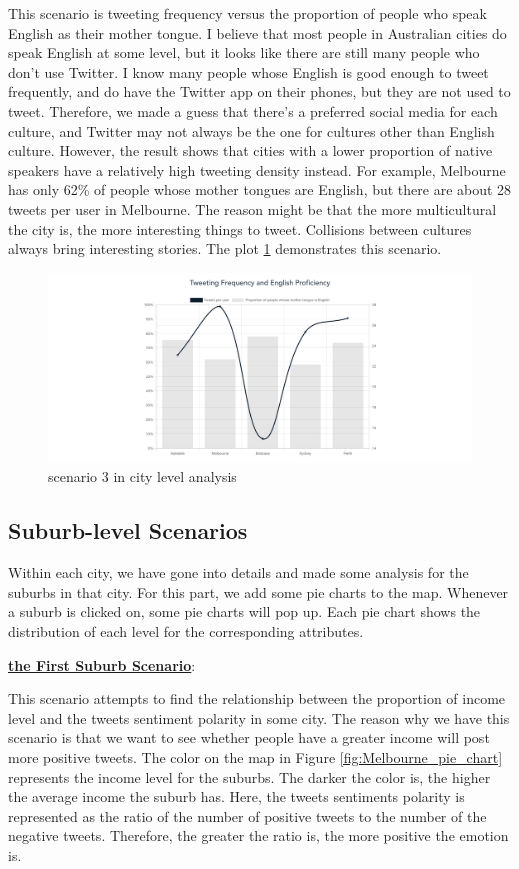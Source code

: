 \documentclass{article}
\begin{document}
This scenario is tweeting frequency versus the proportion of people who speak English as their mother tongue. I believe that most people in Australian cities do speak English at some level, but it looks like there are still many people who don’t use Twitter. I know many people whose English is good enough to tweet frequently, and do have the Twitter app on their phones, but they are not used to tweet. Therefore, we made a guess that there’s a preferred social media for each culture, and Twitter may not always be the one for cultures other than English culture. However, the result shows that cities with a lower proportion of native speakers have a relatively high tweeting density instead. For example, Melbourne has only 62\% of people whose mother tongues are English, but there are about 28 tweets per user in Melbourne. The reason might be that the more multicultural the city is, the more interesting things to tweet. Collisions between cultures always bring interesting stories. The plot 
\ref{fig:Tweeting_and_English} demonstrates this scenario.
\begin{figure}[htp]
\centering
\includegraphics[width=\textwidth]{img/Tweeting_and_English.png}
\caption{scenario 3 in city level analysis}
\label{fig:Tweeting_and_English}
\end{figure} 

\subsection{Suburb-level Scenarios}
Within each city, we have gone into details and made some analysis for the suburbs in that city. For this part, we add some pie charts to the map. Whenever a suburb is clicked on, some pie charts will pop up. Each pie chart shows the distribution of each level for the corresponding attributes.

\textbf{\underline{the First Suburb Scenario}}: 

This scenario attempts to find the relationship between the proportion of income level and the tweets sentiment polarity in some city. The reason why we have this scenario is that we want to see whether people have a greater income will post more positive tweets. The color on the map in Figure
\ref{fig:Melbourne_pie_chart} represents the income level for the suburbs. The darker the color is, the higher the average income the suburb has. Here, the tweets sentiments polarity is represented as the ratio of the number of positive tweets to the number of the negative tweets. Therefore, the greater the ratio is, the more positive the emotion is. 
\end{document}
